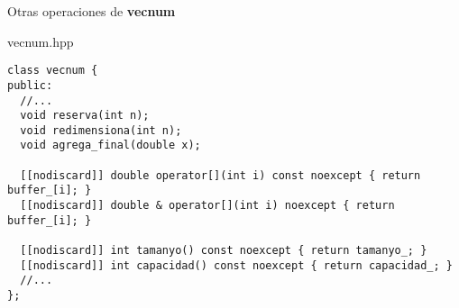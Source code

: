 \begin{frame}[t,fragile]{Otras operaciones de \textbf{vecnum}}
\begin{block}{vecnum.hpp}
\begin{lstlisting}
class vecnum {
public:
  //...
  void reserva(int n);
  void redimensiona(int n);
  void agrega_final(double x);

  [[nodiscard]] double operator[](int i) const noexcept { return buffer_[i]; }
  [[nodiscard]] double & operator[](int i) noexcept { return buffer_[i]; }

  [[nodiscard]] int tamanyo() const noexcept { return tamanyo_; }
  [[nodiscard]] int capacidad() const noexcept { return capacidad_; }
  //...
};
\end{lstlisting}
\end{block}
\end{frame}

